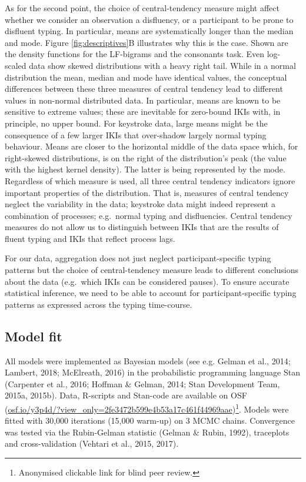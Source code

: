 \documentclass[
  english,
  man,mask,floatsintext]{apa7}
\begin{document}
As for the second point, the choice of central-tendency measure might affect whether we consider an observation a disfluency, or a participant to be prone to disfluent typing. In particular, means are systematically longer than the median and mode. Figure \ref{fig:descriptives}B illustrates why this is the case. Shown are the density functions for the LF-bigrams and the consonants task. Even log-scaled data show skewed distributions with a heavy right tail. While in a normal distribution the mean, median and mode have identical values, the conceptual differences between these three measures of central tendency lead to different values in non-normal distributed data. In particular, means are known to be sensitive to extreme values; these are inevitable for zero-bound IKIs with, in principle, no upper bound. For keystroke data, large means might be the consequence of a few larger IKIs that over-shadow largely normal typing behaviour. Means are closer to the horizontal middle of the data space which, for right-skewed distributions, is on the right of the distribution's peak (the value with the highest kernel density). The latter is being represented by the mode. Regardless of which measure is used, all three central tendency indicators ignore important properties of the distribution. That is, measures of central tendency neglect the variability in the data; keystroke data might indeed represent a combination of processes; e.g.~normal typing and disfluencies. Central tendency measures do not allow us to distinguish between IKIs that are the results of fluent typing and IKIs that reflect process lags.

For our data, aggregation does not just neglect participant-specific typing patterns but the choice of central-tendency measure leads to different conclusions about the data (e.g.~which IKIs can be considered pauses). To ensure accurate statistical inference, we need to be able to account for participant-specific typing patterns as expressed across the typing time-course.

\hypertarget{model-fit}{%
\subsection{Model fit}\label{model-fit}}

All models were implemented as Bayesian models (see e.g. Gelman et al., 2014; Lambert, 2018; McElreath, 2016) in the probabilistic programming language Stan (Carpenter et al., 2016; Hoffman \& Gelman, 2014; Stan Development Team, 2015a, 2015b). Data, R-scripts and Stan-code are available on OSF (\href{https://osf.io/y3p4d/?view_only=2fe3472b599e4b53a17c461f44969aae}{osf.io/y3p4d/?view\_only=2fe3472b599e4b53a17c461f44969aae})\footnote{Anonymised clickable link for blind peer review.}. Models were fitted with 30,000 iterations (15,000 warm-up) on 3 MCMC chains. Convergence was tested via the Rubin-Gelman statistic (Gelman \& Rubin, 1992), traceplots and cross-validation (Vehtari et al., 2015, 2017).
\end{document}
